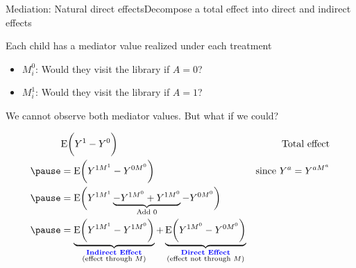 \documentclass{beamer}
\newcommand\E{\text{E}}
\newcommand\bblue[1]{\textcolor{blue}{\textbf{#1}}}
\begin{document}
\begin{frame}{Mediation: Natural direct effects}{Decompose a total effect into direct and indirect effects} \pause

Each child has a mediator value realized under each treatment
\begin{itemize}
\item $M_i^0$: Would they visit the library if $A = 0$?
\item $M_i^1$: Would they visit the library if $A = 1$?
\end{itemize}
We cannot observe both mediator values.  \pause But what if we could? \pause

\begin{footnotesize}
$$\begin{aligned}
&\E\bigg(Y^1 - Y^0\bigg) &\text{Total effect} \\ \pause
&= \E\bigg(Y^{1M^1} - Y^{0M^0}\bigg) &\text{since }Y^{a}=Y^{aM^a} \\ \pause
&= \E\bigg(Y^{1M^1} \underbrace{- Y^{1M^0} + Y^{1M^0}}_\text{Add 0} - Y^{0M^0}\bigg) \\ \pause
&= \underbrace{\E\bigg(Y^{1M^1} - Y^{1M^0}\bigg)}_{\substack{\text{\bblue{Indirect Effect}}\\\text{(effect through $M$)}}} + \underbrace{\E\bigg(Y^{1M^0} - Y^{0M^0}\bigg)}_{\substack{\text{\bblue{Direct Effect}}\\\text{(effect not through $M$)}}}
\end{aligned}$$
\end{footnotesize}
\end{frame}
\end{document}
